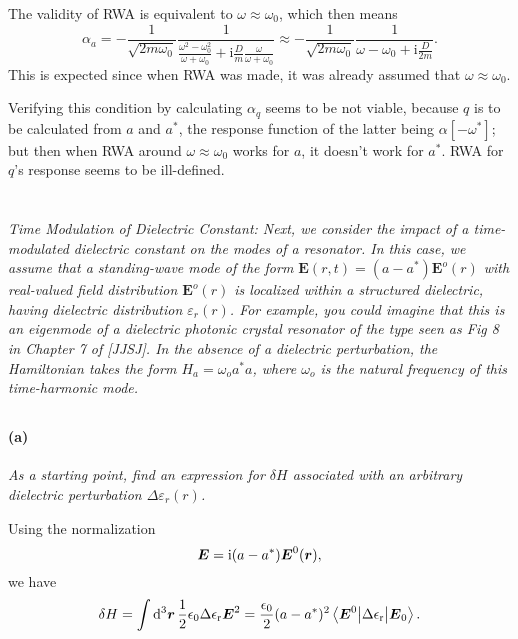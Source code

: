 \documentclass[hyperref, a4paper]{article}
\newcommand*{\ii}{\mathrm{i}}
\newcommand{\epsr}{\epsilon_{\text{r}}}
\begin{document}
The validity of RWA is equivalent to $\omega \approx \omega_0$, 
which then means 
\begin{equation}
    \alpha_a = - \frac{1}{\sqrt{2 m \omega_0}} \frac{1}{\frac{\omega^2 - \omega_0^2}{\omega + \omega_0} + \ii \frac{D}{m} \frac{\omega}{\omega+ \omega_0}}
    \approx - \frac{1}{\sqrt{2 m \omega_0}} \frac{1}{\omega - \omega_0 + \ii \frac{D}{2m}}.
\end{equation}
This is expected since when RWA was made, it was already assumed that $\omega \approx \omega_0$.

Verifying this condition by calculating $\alpha_q$ seems to be not viable, 
because $q$ is to be calculated from $a$ and $a^*$, 
the response function of the latter being $\alpha[-\omega^*]$; 
but then when RWA around $\omega \approx \omega_0$ works for $a$, 
it doesn't work for $a^*$.
RWA for $q$'s response seems to be ill-defined.

\section{}

\textit{Time Modulation of Dielectric Constant: Next, we consider the impact of a time-modulated dielectric constant on the modes of a resonator. In this case, we assume that a standing-wave mode of the form $\mathbf{E}(r, t)=\left(a-a^*\right) \mathbf{E}^o(r)$ with real-valued field distribution $\mathbf{E}^o(r)$ is localized within a structured dielectric, having dielectric distribution $\varepsilon_r(r)$. For example, you could imagine that this is an eigenmode of a dielectric photonic crystal resonator of the type seen as Fig 8 in Chapter 7 of [JJSJ]. In the absence of a dielectric perturbation, the Hamiltonian takes the form $H_a=\omega_o a^* a$, where $\omega_o$ is the natural frequency of this time-harmonic mode.}

\subsection{}

\paragraph*{(a)} \textit{As a starting point, find an expression for $\delta H$ associated with an arbitrary dielectric perturbation $\Delta \varepsilon_r(r)$.} 

Using the normalization 
\begin{equation}
    \vb*{E} = \ii (a - a^*) \vb*{E}^0(\vb*{r}),
\end{equation}
we have 
\begin{equation}
    \var{H} = \int \dd[3]{\vb*{r}} \frac{1}{2} \epsilon_0 \Delta \epsr \vb*{E}^2
    = \frac{\epsilon_0}{2} (a - a^*)^2 \mel**{\vb*{E}^0}{\Delta \epsr}{\vb*{E}_0}.
\end{equation}
\end{document}
